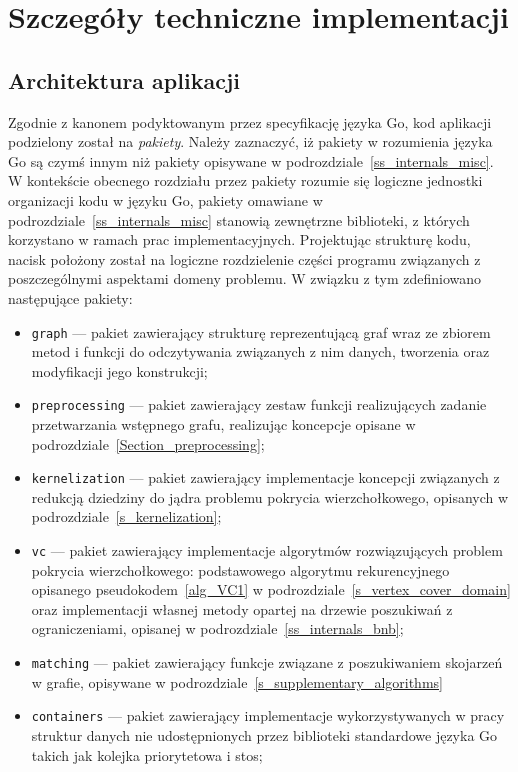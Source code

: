 \section{Szczegóły techniczne implementacji}\label{s_internals_implementation}
\subsection{Architektura aplikacji}\label{ss_internals_architecture}
\par{
  Zgodnie z kanonem podyktowanym przez specyfikację języka Go, kod aplikacji podzielony został na \emph{pakiety}.
  Należy zaznaczyć, iż pakiety w rozumienia języka Go są czymś innym niż pakiety opisywane w podrozdziale~\ref{ss_internals_misc}.
  W kontekście obecnego rozdziału przez pakiety rozumie się logiczne jednostki organizacji kodu w języku Go, pakiety omawiane w podrozdziale~\ref{ss_internals_misc} stanowią zewnętrzne biblioteki, z których korzystano w ramach prac implementacyjnych.
  Projektując strukturę kodu, nacisk położony został na logiczne rozdzielenie części programu związanych z poszczególnymi aspektami domeny problemu.
  W związku z tym zdefiniowano następujące pakiety:
  \begin{itemize}
    \item \texttt{graph} --- pakiet zawierający strukturę reprezentującą graf wraz ze zbiorem metod i funkcji do odczytywania związanych z nim danych, tworzenia oraz modyfikacji jego konstrukcji;
    \item \texttt{preprocessing} --- pakiet zawierający zestaw funkcji realizujących zadanie przetwarzania wstępnego grafu, realizując koncepcje opisane w podrozdziale~\ref{Section_preprocessing};
    \item \texttt{kernelization} --- pakiet zawierający implementacje koncepcji związanych z redukcją dziedziny do jądra problemu pokrycia wierzchołkowego, opisanych w podrozdziale~\ref{s_kernelization};
    \item \texttt{vc} --- pakiet zawierający implementacje algorytmów rozwiązujących problem pokrycia wierzchołkowego: podstawowego algorytmu rekurencyjnego opisanego pseudokodem~\ref{alg_VC1} w podrozdziale~\ref{s_vertex_cover_domain} oraz implementacji własnej metody opartej na drzewie poszukiwań z ograniczeniami, opisanej w podrozdziale~\ref{ss_internals_bnb};
    \item \texttt{matching} --- pakiet zawierający funkcje związane z poszukiwaniem skojarzeń w grafie, opisywane w podrozdziale~\ref{s_supplementary_algorithms}
    \item \texttt{containers} --- pakiet zawierający implementacje wykorzystywanych w pracy struktur danych nie udostępnionych przez biblioteki standardowe języka Go takich jak kolejka priorytetowa i stos;

\end{itemize}}
